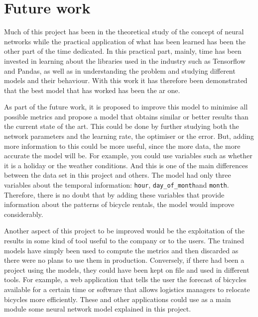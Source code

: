 \section{Future work}\label{future_work}

Much of this project has been in the theoretical study of the concept of neural networks while the practical application of what has been learned has been the other part of the time dedicated. In this practical part, mainly, time has been invested in learning about the libraries used in the industry such as Tensorflow and Pandas, as well as in understanding the problem and studying different models and their behaviour. With this work it has therefore been demonstrated that the best model that has worked has been the \acrshort{ar} one.
\newline


As part of the future work, it is proposed to improve this model to minimise all possible metrics and propose a model that obtains similar or better results than the current state of the art. This could be done by further studying both the network parameters and the learning rate, the optimiser or the error. But, adding more information to this could be more useful, since the more data, the more accurate the model will be. For example, you could use variables such as whether it is a holiday or the weather conditions. And this is one of the main differences between the data set in this project and others. The model had only three variables about the temporal information: \small{\verb|hour|}\normalsize, \small{\verb|day_of_month|}\normalsize and \small{\verb|month|}\normalsize. Therefore, there is no doubt that by adding these variables that provide information about the patterns of bicycle rentals, the model would improve considerably.
\newline

Another aspect of this project to be improved would be the exploitation of the results in some kind of tool useful to the company or to the users. The trained models have simply been used to compute the metrics and then discarded as there were no plans to use them in production. Conversely, if there had been a project using the models, they could have been kept on file and used in different tools. For example, a web application that tells the user the forecast of bicycles available for a certain time or software that allows logistics managers to relocate bicycles more efficiently. These and other applications could use as a main module some neural network model explained in this project.
\newline


